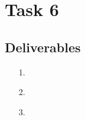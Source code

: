 

    \chapter{Task 6}
    \section{Deliverables }
    \begin{itemize}
        \item[] 
    \end{itemize}
    
    \begin{itemize}
        \item[1.] 
        \item[2.] 
        \item[3.] 
    \end{itemize}
    

    
    

